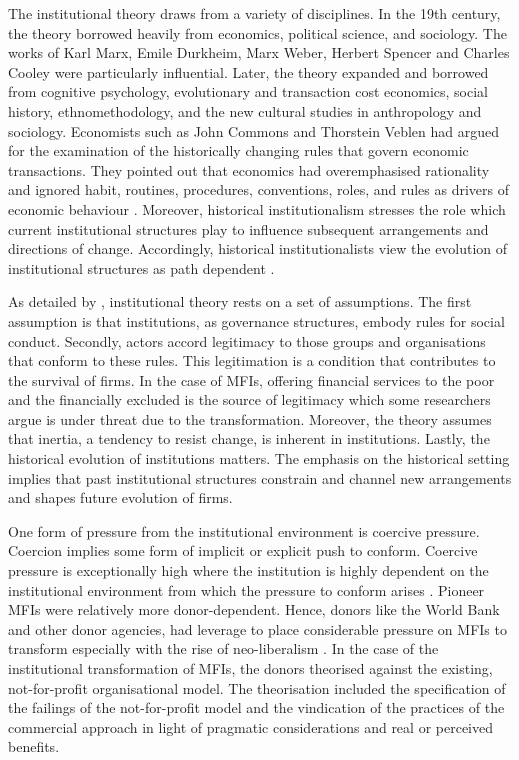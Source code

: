 \documentclass[a4paper, nobind]{templates/ociamthesis}
\begin{document}
The institutional theory draws from a variety of disciplines. In the 19th century, the theory borrowed heavily from economics, political science, and sociology. The works of Karl Marx, Emile Durkheim, Marx Weber, Herbert Spencer and Charles Cooley were particularly influential. Later, the theory expanded and borrowed from cognitive psychology, evolutionary and transaction cost economics, social history, ethnomethodology, and the new cultural studies in anthropology and sociology. Economists such as John Commons and Thorstein Veblen had argued for the examination of the historically changing rules that govern economic transactions. They pointed out that economics had overemphasised rationality and ignored habit, routines, procedures, conventions, roles, and rules as drivers of economic behaviour \autocite{scott2005institutional}. Moreover, historical institutionalism stresses the role which current institutional structures play to influence subsequent arrangements and directions of change. Accordingly, historical institutionalists view the evolution of institutional structures as path dependent \autocite{tina2002institutional}.

As detailed by \textcite{ritzer2004encyclopedia}, institutional theory rests on a set of assumptions. The first assumption is that institutions, as governance structures, embody rules for social conduct. Secondly, actors accord legitimacy to those groups and organisations that conform to these rules. This legitimation is a condition that contributes to the survival of firms. In the case of MFIs, offering financial services to the poor and the financially excluded is the source of legitimacy which some researchers argue is under threat due to the transformation. Moreover, the theory assumes that inertia, a tendency to resist change, is inherent in institutions. Lastly, the historical evolution of institutions matters. The emphasis on the historical setting implies that past institutional structures constrain and channel new arrangements and shapes future evolution of firms.

One form of pressure from the institutional environment is coercive pressure. Coercion implies some form of implicit or explicit push to conform. Coercive pressure is exceptionally high where the institution is highly dependent on the institutional environment from which the pressure to conform arises \autocite{meyer1977institutionalized}. Pioneer MFIs were relatively more donor-dependent. Hence, donors like the World Bank and other donor agencies, had leverage to place considerable pressure on MFIs to transform especially with the rise of neo-liberalism \autocite{ostry2016neoliberalism}. In the case of the institutional transformation of MFIs, the donors theorised against the existing, not-for-profit organisational model. The theorisation included the specification of the failings of the not-for-profit model and the vindication of the practices of the commercial approach in light of pragmatic considerations \autocite{tina2002institutional} and real or perceived benefits.
\end{document}
